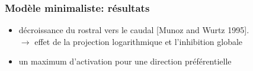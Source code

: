 \documentclass[10pt]{beamer}
\begin{document}
\begin{frame}
  \frametitle{Mod\`ele minimaliste: r\'esultats}
\begin{itemize}
\item d\'ecroissance du rostral vers le caudal [Munoz and Wurtz 1995].
\\{\color {blue} $\to$} effet de la projection logarithmique et l'inhibition globale
\item un maximum d'activation pour une direction pr\'ef\'erentielle 
\end{itemize}
\begin{columns}
    \begin{column}{0.8\textwidth}
\begin{center}
\end{center}
\end{column}
\begin{column}{0.4\textwidth}
\begin{center}
\end{center}
\end{column}
\end{columns}
\end{frame}
\end{document}
